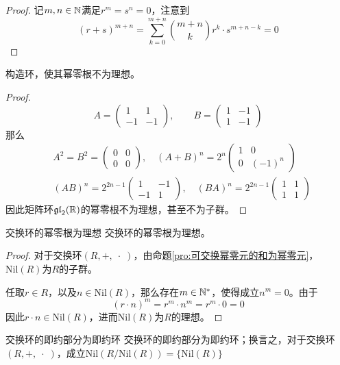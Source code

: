 \begin{proof}
	记$m,n\in\mathbb{N}$满足$r^m=s^n=0$，注意到
	$$
	(r+s)^{m+n}=\sum_{k=0}^{m+n}{m+n\choose k}r^{k}\cdot s^{m+n-k}=0
	$$
\end{proof}

\begin{example}
	构造环，使其幂零根不为理想。
\end{example}

\begin{proof}
	$$
	A=\begin{pmatrix}1&1\\-1&-1\end{pmatrix},\qquad
	B=\begin{pmatrix}1&-1\\1&-1\end{pmatrix}
	$$
	那么
	\begin{align*}
		&A^2=B^2=\begin{pmatrix}0&0\\0&0\end{pmatrix},\quad 
		(A+B)^n=2^n\begin{pmatrix}1&0\\0&(-1)^n\end{pmatrix}\\
		&(AB)^n=2^{2n-1}\begin{pmatrix}1&-1\\-1&1\end{pmatrix},\quad
		(BA)^n=2^{2n-1}\begin{pmatrix}1&1\\1&1\end{pmatrix}
	\end{align*}
	因此矩阵环$\mathfrak{gl}_2(\mathbb{R})$的幂零根不为理想，甚至不为子群。
\end{proof}

\begin{proposition}{}{交换环的幂零根为理想}
	交换环的幂零根为理想。
\end{proposition}

\begin{proof}
	对于交换环$(R,+,\;\cdot\;)$，由命题\ref{pro:可交换幂零元的和为幂零元}，$\mathrm{Nil}(R)$为$R$的子群。
	
	任取$r\in R$，以及$n\in\mathrm{Nil}(R)$，那么存在$m\in \mathbb{N}^*$，使得成立$n^m=0$。由于
	$$
	(r\cdot n)^m=r^m\cdot n^m=r^m\cdot 0=0
	$$
	因此$r\cdot n\in\mathrm{Nil}(R)$，进而$\mathrm{Nil}(R)$为$R$的理想。
\end{proof}

\begin{proposition}{交换环的即约部分为即约环}
	交换环的即约部分为即约环；换言之，对于交换环$(R,+,\;\cdot \;)$，成立$\mathrm{Nil}(R/\mathrm{Nil}(R))=\{ \mathrm{Nil}(R) \}$
\end{proposition}

